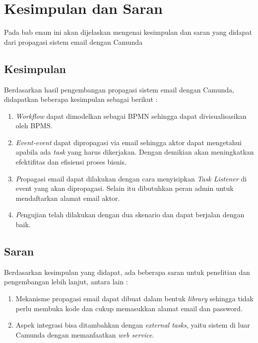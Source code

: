 \chapter{Kesimpulan dan Saran}
\label{chap:kesimpulan_saran}
Pada bab enam ini akan dijelaskan mengenai kesimpulan dan saran yang didapat dari propagasi sistem email dengan Camunda 
\section{Kesimpulan}
\label{sec:kesimpulan}
Berdasarkan hasil pengembangan propagasi sistem email dengan Camunda, didapatkan beberapa kesimpulan sebagai berikut :
\begin{enumerate}
	\item \textit{Workflow} dapat dimodelkan sebagai BPMN sehingga dapat divisualisasikan oleh BPMS. 
	\item \textit{Event-event} dapat dipropagasi via email sehingga aktor dapat mengetahui apabila ada \textit{task} yang harus dikerjakan. Dengan demikian akan meningkatkan efektifitas dan efisiensi proses bisnis.
	\item \textit Propagasi email dapat dilakukan dengan cara menyisipkan \textit{Task Listener} di event yang akan dipropagasi. Selain itu dibutuhkan peran admin untuk mendaftarkan alamat email aktor.
	\item \textit Pengujian telah dilakukan dengan dua skenario dan dapat berjalan dengan baik.
	

\end{enumerate}

\section{Saran}
\label{sec:saran}
Berdasarkan kesimpulan yang didapat, ada beberapa saran untuk penelitian dan pengembangan lebih lanjut, antara lain :
\begin{enumerate}
	\item Mekanisme propagasi email dapat dibuat dalam bentuk \textit{library} sehingga tidak perlu membuka kode dan cukup memasukkan alamat email dan password.
	\item Aspek integrasi bisa ditambahkan dengan \textit{external tasks}, yaitu sistem di luar Camunda dengan memanfaatkan \textit{web service}.
\end{enumerate}
